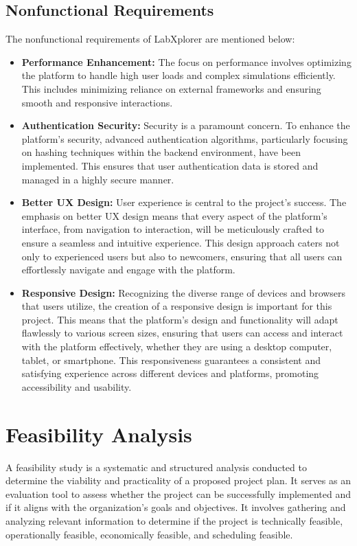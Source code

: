 \subsection{Nonfunctional Requirements}
The nonfunctional requirements of LabXplorer are mentioned below:
\begin{itemize}
    \item \textbf{Performance Enhancement:} The focus on performance involves optimizing the platform to handle high user loads and complex simulations efficiently. This includes minimizing reliance on external frameworks and ensuring smooth and responsive interactions.
    \item \textbf{Authentication Security:} Security is a paramount concern. To enhance the platform’s security, advanced authentication algorithms, particularly focusing on hashing techniques within the backend environment, have been implemented. This ensures that user authentication data is stored and managed in a highly secure manner.
    \item \textbf{Better UX Design:} User experience is central to the project’s success. The emphasis on better UX design means that every aspect of the platform’s interface, from navigation to interaction, will be meticulously crafted to ensure a seamless and intuitive experience. This design approach caters not only to experienced users but also to newcomers, ensuring that all users can effortlessly navigate and engage with the platform.
    \item \textbf{Responsive Design:} Recognizing the diverse range of devices and browsers that users utilize, the creation of a responsive design is important for this project. This means that the platform’s design and functionality will adapt flawlessly to various screen sizes, ensuring that users can access and interact with the platform effectively, whether they are using a desktop computer, tablet, or smartphone. This responsiveness guarantees a consistent and satisfying experience across different devices and platforms, promoting accessibility and usability.
\end{itemize}
\section{Feasibility Analysis}
A feasibility study is a systematic and structured analysis conducted to determine the viability and practicality of a proposed project plan. It serves as an evaluation tool to assess whether the project can be successfully implemented and if it aligns with the organization's goals and objectives. It involves gathering and analyzing relevant information to determine if the project is technically feasible, operationally feasible, economically feasible, and scheduling feasible.
